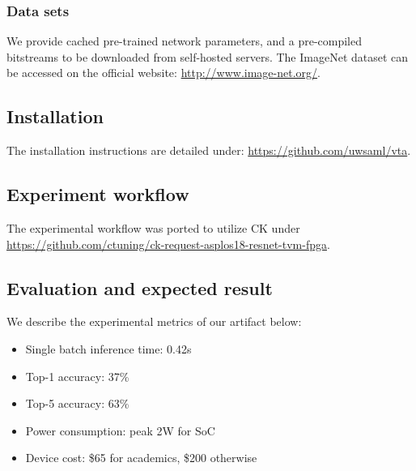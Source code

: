 \documentclass[sigconf]{acmart}
\begin{document}
\subsubsection{Data sets}

We provide cached pre-trained network parameters, and a pre-compiled bitstreams to be downloaded from self-hosted servers. 
The ImageNet dataset can be accessed on the official website: \url{http://www.image-net.org/}.

\subsection{Installation}

The installation instructions are detailed under: \url{https://github.com/uwsaml/vta}.

\subsection{Experiment workflow}

The experimental workflow was ported to utilize CK under \url{https://github.com/ctuning/ck-request-asplos18-resnet-tvm-fpga}.

\subsection{Evaluation and expected result}
We describe the experimental metrics of our artifact below:
\begin{itemize}
\item Single batch inference time: 0.42s
\item Top-1 accuracy: 37\%
\item Top-5 accuracy: 63\%
\item Power consumption: peak 2W for SoC
\item Device cost: \$65 for academics, \$200 otherwise
\end{itemize}


\end{document}
